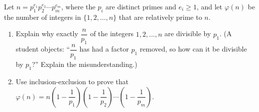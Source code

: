Let $n=p_1^{e_1}p_2^{e_2}\cdots p_m^{e_m}$, where the $p_i$ are distinct primes and $e_i\ge1$, and let $\varphi(n)$ be the number of integers in $\{1,2,\dots,n\}$ that are relatively prime to $n$.
\begin{enumerate}
\item[(a)] Explain why exactly $\dfrac{n}{p_1}$ of the integers $1,2,\dots,n$ are divisible by $p_1$. (A student objects: ``$\dfrac{n}{p_1}$ has had a factor $p_1$ removed, so how can it be divisible by $p_1$?'' Explain the misunderstanding.)
\item[(b)] Use inclusion-exclusion to prove that $\varphi(n)=n\left(1-\dfrac{1}{p_1}\right)\left(1-\dfrac{1}{p_2}\right)\cdots\left(1-\dfrac{1}{p_m}\right)$.
\end{enumerate}

